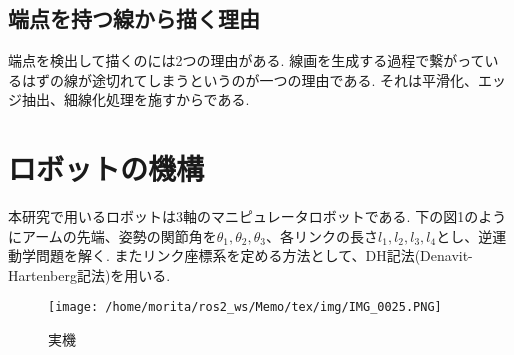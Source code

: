 \documentclass[a4j]{jarticle}			%
\begin{document}
\begin{multicols}{2}

\subsection{端点を持つ線から描く理由}
端点を検出して描くのには2つの理由がある.
線画を生成する過程で繋がっているはずの線が途切れてしまうというのが一つの理由である.
それは平滑化、エッジ抽出、細線化処理を施すからである.

\end{multicols}
\section{ロボットの機構}
本研究で用いるロボットは3軸のマニピュレータロボットである.
下の図1のようにアームの先端、姿勢の関節角を$\theta_1, \theta_2, \theta_3$、各リンクの長さ$l_1, l_2, l_3, l_4$とし、逆運動学問題を解く.
またリンク座標系を定める方法として、DH記法(Denavit-Hartenberg記法)を用いる.


\begin{figure}[htbp]
\begin{center}
\texttt{[image: /home/morita/ros2\_ws/Memo/tex/img/IMG\_0025.PNG]}
\caption{実機}
\end{center}
\end{figure}
\end{document}
